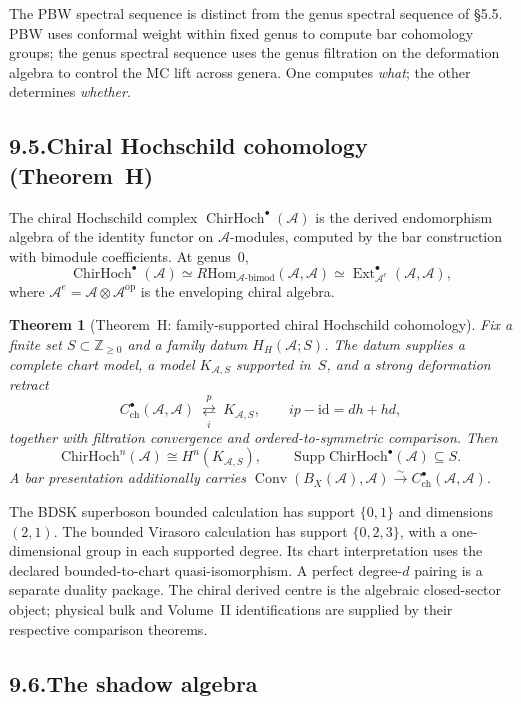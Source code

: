 \documentclass[11pt,reqno]{amsart}
\newtheorem{theorem}{Theorem}[section]
\theoremstyle{definition}
\theoremstyle{remark}
\providecommand{\cA}{\mathcal{A}}
\providecommand{\Hom}{\mathrm{Hom}}
\providecommand{\ChirHoch}{\mathrm{ChirHoch}}
\numberwithin{equation}{section}
\begin{document}
The PBW spectral sequence is distinct from the genus spectral sequence
of \S5.5. PBW uses conformal weight within fixed genus to compute bar
cohomology groups; the genus spectral sequence uses the genus
filtration on the deformation algebra to control the MC lift across
genera. One computes \emph{what}; the other determines \emph{whether}.

\subsection*{9.5.\enspace Chiral Hochschild cohomology (Theorem~H)}

The chiral Hochschild complex $\operatorname{ChirHoch}^\bullet(\cA)$
is the derived endomorphism algebra of the identity functor on
$\cA$-modules, computed by the bar construction with bimodule
coefficients. At genus~$0$,
\[
\operatorname{ChirHoch}^\bullet(\cA)\simeq R\Hom_{\cA\text{-bimod}}(\cA,\cA)\simeq\operatorname{Ext}^\bullet_{\cA^e}(\cA,\cA),
\]
where $\cA^e=\cA\otimes\cA^{\mathrm{op}}$ is the enveloping chiral
algebra.

\begin{theorem}[Theorem~H: family-supported chiral Hochschild
cohomology]\label{thm:svy-theorem-h-v2}
Fix a finite set \(S\subset\mathbb Z_{\ge0}\) and a family datum
\(H_H(\cA;S)\).  The datum supplies a complete chart model, a model
\(K_{\cA,S}\) supported in~\(S\), and a strong deformation retract
\[
C^\bullet_{\mathrm{ch}}(\cA,\cA)
\ \underset{i}{\overset{p}{\rightleftarrows}}\
K_{\cA,S},
\qquad ip-\mathrm{id}=dh+hd,
\]
together with filtration convergence and ordered-to-symmetric
comparison.  Then
\[
\ChirHoch^n(\cA)\cong H^n(K_{\cA,S}),\qquad
\operatorname{Supp}\ChirHoch^\bullet(\cA)\subseteq S.
\]
A bar presentation additionally carries
\(\operatorname{Conv}(B_X(\cA),\cA)
\xrightarrow{\sim}C^\bullet_{\mathrm{ch}}(\cA,\cA)\).
\end{theorem}

The BDSK superboson bounded calculation has support \(\{0,1\}\) and
dimensions \((2,1)\).  The bounded Virasoro calculation has support
\(\{0,2,3\}\), with a one-dimensional group in each supported degree.
Its chart interpretation uses the declared bounded-to-chart
quasi-isomorphism.  A perfect degree-\(d\) pairing is a separate
duality package.  The chiral derived centre is the algebraic
closed-sector object; physical bulk and Volume~II identifications are
supplied by their respective comparison theorems.

\subsection*{9.6.\enspace The shadow algebra}
\end{document}
